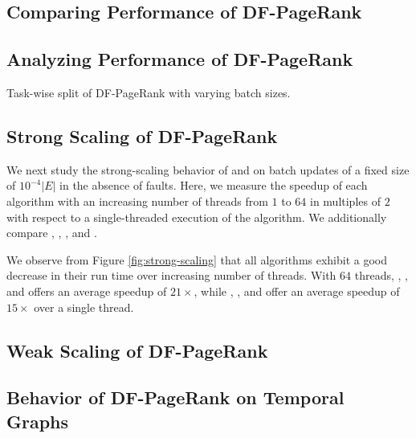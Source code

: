 % 



\subsection{Comparing Performance of DF-PageRank}

\subsection{Analyzing Performance of DF-PageRank}

Task-wise split of DF-PageRank with varying batch sizes.

\subsection{Strong Scaling of DF-PageRank}

We next study the strong-scaling behavior of \FroWbar{} and \FroBarf{} on batch updates of a fixed size of $10^{-4} |E|$ in the absence of faults. Here, we measure the speedup of each algorithm with an increasing number of threads from $1$ to $64$ in multiples of $2$ with respect to a single-threaded execution of the algorithm. We additionally compare \StaWbar{}, \StaBarf{}, \NaiWbar{}, and \NaiBarf{}.

We observe from Figure \ref{fig:strong-scaling} that all algorithms exhibit a good decrease in their run time over increasing number of threads. With $64$ threads, \StaBarf{}, \NaiBarf{}, and \FroBarf{} offers an average speedup of $21\times$, while \StaWbar{}, \NaiWbar{}, and \FroWbar{} offer an average speedup of $15\times$ over a single thread.


\subsection{Weak Scaling of DF-PageRank}

\subsection{Behavior of DF-PageRank on Temporal Graphs}
